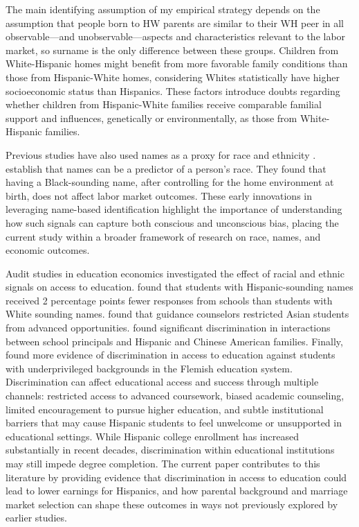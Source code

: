 The main identifying assumption of my empirical strategy depends on the assumption that people born to HW parents are similar to their WH peer in all observable---and unobservable---aspects and characteristics relevant to the labor market, so surname is the only difference between these groups. Children from White-Hispanic homes might benefit from more favorable family conditions than those from Hispanic-White homes, considering Whites statistically have higher socioeconomic status than Hispanics.  These factors introduce doubts regarding whether children from Hispanic-White families receive comparable familial support and influences, genetically or environmentally, as those from White-Hispanic families.

Previous studies have also used names as a proxy for race and ethnicity \autocite{fryer2004causes, bertrand2004emily}. \textcite{fryer2004causes} establish that names can be a predictor of a person's race. They found that having a Black-sounding name, after controlling for the home environment at birth, does not affect labor market outcomes. These early innovations in leveraging name-based identification highlight the importance of understanding how such signals can capture both conscious and unconscious bias, placing the current study within a broader framework of research on race, names, and economic outcomes. 

Audit studies in education economics investigated the effect of racial and ethnic signals on access to education. \textcite{bergman2018education} found that students with Hispanic-sounding names received 2 percentage points fewer responses from schools than students with White sounding names. \textcite{janssen2022guidance} found that guidance counselors restricted Asian students from advanced opportunities. \textcite{gaddis2024racial} found significant discrimination in interactions between school principals and Hispanic and Chinese American families. Finally, \textcite{bourabain2023school} found more evidence of discrimination in access to education against students with underprivileged backgrounds in the Flemish education system. Discrimination can affect educational access and success through multiple channels: restricted access to advanced coursework, biased academic counseling, limited encouragement to pursue higher education, and subtle institutional barriers that may cause Hispanic students to feel unwelcome or unsupported in educational settings. While Hispanic college enrollment has increased substantially in recent decades, discrimination within educational institutions may still impede degree completion. The current paper contributes to this literature by providing evidence that discrimination in access to education could lead to lower earnings for Hispanics, and how parental background and marriage market selection can shape these outcomes in ways not previously explored by earlier studies.

